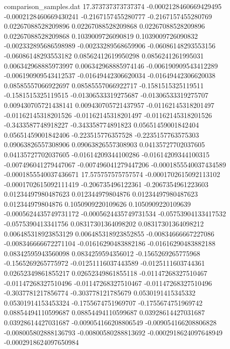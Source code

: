 \begin{filecontents}{comparison_samples.dat}
17.373737373737374  -0.0002128460669429495  -0.0002128460669430241  -0.2167157455280777    -0.2167157455280769    0.02267088528209896    0.02267088528209868    0.02267088528209896    0.02267088528209868    0.1039009726090819     0.1039009726090832     -0.002332895686598989   -0.00233289568659906    -0.06086148293553156   -0.06086148293553182   0.08562412619950298     0.0856241261995031      0.006342968885973997    0.006342968885974146    -0.006190909543412289   -0.006190909543412537   -0.01649442306620034    -0.01649442306620038    0.08585557066922697     0.08585557066922717     -0.1581515325119511     -0.1581515325119515     -0.01306533319275687   -0.01306533319275707   0.009430705721438141   0.009430705721437957   -0.01162145318201497    -0.01162145318201526    -0.01162145318201497    -0.01162145318201526    -0.3433587748918227    -0.343358774891823     0.05651459001842404     0.05651459001842406     -0.223515776357528     -0.2235157763575303    0.09063826557308906     0.09063826557308903     0.04135727702037605     0.04135727702037605     -0.01614209344100286   -0.01614209344100315   -0.007496041279447067  -0.007496041279447206  -0.0001855540037434589  -0.0001855540037436671
17.575757575757574  -0.0001702615092113102  -0.0001702615092111419  -0.206735496122361     -0.2067354961223603    0.01234497980487623    0.012344979804876      0.01234497980487623    0.012344979804876      0.1050909220109626     0.1050909220109639     -0.0005624435749731172  -0.0005624435749731534  -0.05753904133417532   -0.0575390413341756    0.08317301364098202     0.08317301364098212     0.006485318923853129    0.006485318923852855    -0.00834666667227086    -0.008346666672271104   -0.01616290483882186    -0.01616290483882188    0.08342595943560098     0.0834259594356012      -0.1565269265775968     -0.1565269265775972     -0.01251116037443589   -0.0125111603744361    0.02652349861855217    0.02652349861855118    -0.01147268327510467    -0.01147268327510496    -0.01147268327510467    -0.01147268327510496    -0.3037781217856774    -0.303778121785679     0.0530191415345332      0.05301914153453324     -0.1755674751969707    -0.1755674751969742    0.08854494110599687     0.08854494110599687     0.03928614427031687     0.03928614427031687     -0.009054166208806549  -0.009054166208806828  -0.008005802888136793  -0.00800580288813692   -0.0002918624097648949  -0.0002918624097650984

\end{filecontents}
